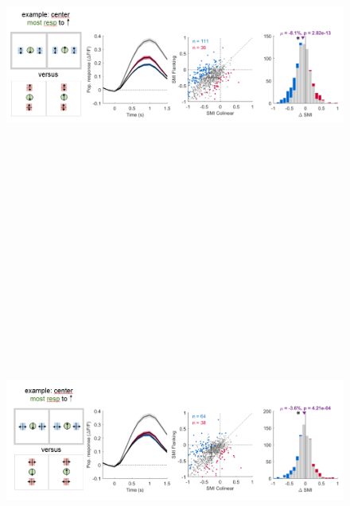 \begin{figure}[H] \centering \includegraphics[width=12cm,height=12cm,keepaspectratio]{Figures/7.Results/finalPopulation/sel/diagrams/10.png} 
\end{figure}

\begin{figure}[H] \centering \includegraphics[width=12cm,height=12cm,keepaspectratio]{Figures/7.Results/finalPopulation/sel/diagrams/11.png} 
\end{figure}

